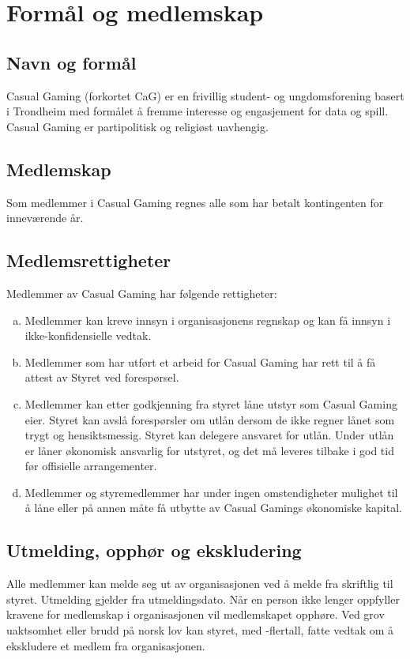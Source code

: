 \chapter{Formål og medlemskap}

\emptychapterspacing

\section{Navn og formål}
Casual Gaming (forkortet CaG) er en frivillig student- og ungdomsforening basert i Trondheim med formålet å fremme interesse og engasjement for data og spill. Casual Gaming er partipolitisk og religiøst uavhengig.

\section{Medlemskap}
Som medlemmer i Casual Gaming regnes alle som har betalt kontingenten for inneværende år.

\section{Medlemsrettigheter}
Medlemmer av Casual Gaming har følgende rettigheter:
\begin{enumerate}[a.]
    \item Medlemmer kan kreve innsyn i organisasjonens regnskap og kan få innsyn i ikke-konfiden\-sielle vedtak.
    \item Medlemmer som har utført et arbeid for Casual Gaming har rett til å få attest av Styret ved forespørsel.
    \item Medlemmer kan etter godkjenning fra styret låne utstyr som Casual Gaming eier. Styret kan avslå forespørsler om utlån dersom de ikke regner lånet som trygt og hensiktsmessig. Styret kan delegere ansvaret for utlån. Under utlån er låner økonomisk ansvarlig for utstyret, og det må leveres tilbake i god tid før offisielle arrangementer.
    \item Medlemmer og styremedlemmer har under ingen omstendigheter mulighet til å låne eller på annen måte få utbytte av Casual Gamings økonomiske kapital.
\end{enumerate}

\section{Utmelding, opphør og ekskludering}
Alle medlemmer kan melde seg ut av organisasjonen ved å melde fra skriftlig til styret. Utmelding gjelder fra utmeldingsdato. Når en person ikke lenger oppfyller kravene for medlemskap i organisasjonen vil medlemskapet opphøre. Ved grov uaktsomhet eller brudd på norsk lov kan styret, med -flertall, fatte vedtak om å ekskludere et medlem fra organisasjonen.
